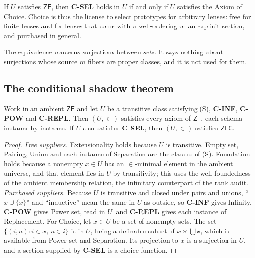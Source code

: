 \begin{corollary}\label{cor:choice}
If $U$ satisfies $\mathsf{ZF}$, then \textbf{C-SEL} holds in $U$ if and only if $U$ satisfies the
Axiom of Choice. Choice is thus the license to select prototypes for arbitrary lenses: free for
finite lenses and for lenses that come with a well-ordering or an explicit section, and purchased
in general.
\end{corollary}

The equivalence concerns surjections between \emph{sets}. It says nothing about surjections whose
source or fibers are proper classes, and it is not used for them.

\subsection{The conditional shadow theorem}

\begin{theorem}\label{thm:shadow}
Work in an ambient $\mathsf{ZF}$ and let $U$ be a transitive class satisfying \textup{(S)},
\textbf{C-INF}, \textbf{C-POW} and \textbf{C-REPL}. Then $(U,\in)$ satisfies every axiom of
$\mathsf{ZF}$, each schema instance by instance. If $U$ also satisfies \textbf{C-SEL}, then
$(U,\in)$ satisfies $\mathsf{ZFC}$.
\end{theorem}

\begin{proof}
\emph{Free suppliers.} Extensionality holds because $U$ is transitive. Empty set, Pairing, Union
and each instance of Separation are the clauses of (S). Foundation holds because a nonempty
$x\in U$ has an $\in$-minimal element in the ambient universe, and that element lies in $U$ by
transitivity; this uses the well-foundedness of the ambient membership relation, the infinitary
counterpart of the rank audit. \emph{Purchased suppliers.} Because $U$ is transitive and closed
under pairs and unions, ``$x\cup\{x\}$'' and ``inductive'' mean the same in $U$ as outside, so
\textbf{C-INF} gives Infinity. \textbf{C-POW} gives Power set, read in $U$, and \textbf{C-REPL}
gives each instance of Replacement. For Choice, let $x\in U$ be a set of nonempty sets. The set
$\{(i,a): i\in x,\ a\in i\}$ is in $U$, being a definable subset of $x\times\bigcup x$, which is
available from Power set and Separation. Its projection to $x$ is a surjection in $U$, and a
section supplied by \textbf{C-SEL} is a choice function.
\end{proof}

